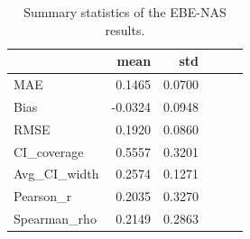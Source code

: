 \begin{table}
\caption{Summary statistics of the EBE-NAS results.}
\label{tab:ebe_summary}
\begin{tabular}{lrrrrr}
\toprule
 & mean & std \\
\midrule
MAE & 0.1465 & 0.0700 \\
Bias & -0.0324 & 0.0948 \\
RMSE & 0.1920 & 0.0860 \\
CI_coverage & 0.5557 & 0.3201 \\
Avg_CI_width & 0.2574 & 0.1271 \\
Pearson_r & 0.2035 & 0.3270 \\
Spearman_rho & 0.2149 & 0.2863 \\
\bottomrule
\end{tabular}
\end{table}
